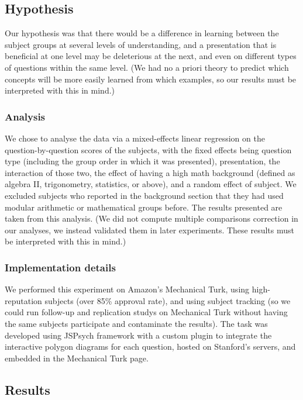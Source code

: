 \documentclass[11pt]{article}
\begin{document}
\subsection{Hypothesis}
Our hypothesis was that there would be a difference in learning between the subject groups at several levels of understanding, and a presentation that is beneficial at one level may be deleterious at the next, and even on different types of questions within the same level. (We had no a priori theory to predict which concepts will be more easily learned from which examples, so our results must be interpreted with this in mind.)
\subsubsection{Analysis}
We chose to analyse the data via a mixed-effects linear regression on the question-by-question scores of the subjects, with the fixed effects being question type (including the group order in which it was presented), presentation, the interaction of those two, the effect of having a high math background (defined as algebra II, trigonometry, statistics, or above), and a random effect of subject. We excluded subjects who reported in the background section that they had used modular arithmetic or mathematical groups before. The results presented are taken from this analysis. (We did not compute multiple comparisons correction in our analyses, we instead validated them in later experiments. These results must be interpreted with this in mind.) 
\subsubsection{Implementation details}
We performed this experiment on Amazon's Mechanical Turk, using high-reputation subjects (over 85\% approval rate), and using subject tracking (so we could run follow-up and replication studys on Mechanical Turk without having the same subjects participate and contaminate the results). The task was developed using JSPsych framework with a custom plugin to integrate the interactive polygon diagrams for each question, hosted on Stanford's servers, and embedded in the Mechanical Turk page.  
\subsection{Results}
\end{document}

